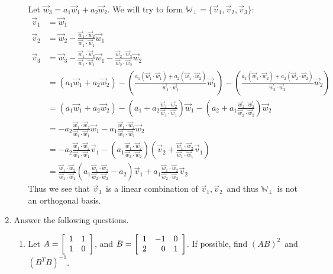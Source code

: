 \documentclass{letter}
\newcounter{question}
\newcommand{\Vn}[1]{\vec{#1}}
\newcommand{\?}{\stackrel{?}{=}}
\newcommand\Que[1]{%
   \leavevmode\noindent
   #1
}
\newcommand\Ans[2][]{%
   \leavevmode\noindent
   {
       \begin{mdframed}[backgroundcolor=blue!10]
       #2
       \end{mdframed}
   }
}
\newenvironment{Mat}[1]{%
  \left[\begin{array}{*{#1}{r}}
}{%
  \end{array}\right]
}
\begin{document}
\begin{enumerate}
\begin{enumerate}[label=(\alph*)]
    \Ans{
        Let $\Vn{w}_3 = a_1\Vn{w}_1 + a_2\Vn{w}_2$.  We will try to form $\mathbb{W}_\perp=\{\Vn{v}_1,\Vn{v}_2,\Vn{v}_3\}$:
        \begin{align*}
            \Vn{v}_1 &= \Vn{w}_1 \\
            \Vn{v}_2 &= \Vn{w}_2 - \frac{\Vn{w}_1\cdot\Vn{w}_2}{\Vn{w}_1\cdot\Vn{w}_1}\Vn{w}_1\\
            \Vn{v}_3 &= \Vn{w}_3 - \frac{\Vn{w}_1\cdot\Vn{w}_3}{\Vn{w}_1\cdot\Vn{w}_1}\Vn{w}_1 - \frac{\Vn{w}_2\cdot\Vn{w}_3}{\Vn{w}_2\cdot\Vn{w}_2}\Vn{w}_2 \\
            &= (a_1\Vn{w}_1 + a_2\Vn{w}_2) - 
               \left(\frac{a_1(\Vn{w}_1\cdot\Vn{w}_1)+a_2(\Vn{w}_1\cdot\Vn{w}_2)}{\Vn{w}_1\cdot\Vn{w}_1}\Vn{w}_1\right) -
               \left(\frac{a_1(\Vn{w}_1\cdot\Vn{w}_2)+a_2(\Vn{w}_2\cdot\Vn{w}_2)}{\Vn{w}_2\cdot\Vn{w}_2}\Vn{w}_2\right)\\
            &= (a_1\Vn{w}_1 + a_2\Vn{w}_2) -
               \left( a_1 + a_2\frac{\Vn{w}_1\cdot\Vn{w}_2}{\Vn{w}_1\cdot\Vn{w}_1}\right)\Vn{w}_1 -
               \left(a_2 + a_1\frac{\Vn{w}_1\cdot\Vn{w}_2}{\Vn{w}_2\cdot\Vn{w}_2}\right)\Vn{w}_2 \\
            &= -a_2\frac{\Vn{w}_1\cdot\Vn{w}_2}{\Vn{w}_1\cdot\Vn{w}_1}\Vn{w}_1 - 
                a_1\frac{\Vn{w}_1\cdot\Vn{w}_2}{\Vn{w}_2\cdot\Vn{w}_2}\Vn{w}_2 \\
            &= -a_2\frac{\Vn{w}_1\cdot\Vn{w}_2}{\Vn{w}_1\cdot\Vn{w}_1}\Vn{v}_1 - 
               \left(a_1\frac{\Vn{w}_1\cdot\Vn{w}_2}{\Vn{w}_2\cdot\Vn{w}_2}\right)
               \left(\Vn{v}_2 + \frac{\Vn{w}_1\cdot\Vn{w}_2}{\Vn{w}_1\cdot\Vn{w}_1}\Vn{v}_1\right)\\
            &= \frac{\Vn{w}_1\cdot\Vn{w}_2}{\Vn{w}_1\cdot\Vn{w}_1}
               \left(a_1\frac{\Vn{w}_1\cdot\Vn{w}_2}{\Vn{w}_2\cdot\Vn{w}_2}-a_2\right)\Vn{v}_1 +
               a_1\frac{\Vn{w}_1\cdot\Vn{w}_2}{\Vn{w}_2\cdot\Vn{w}_2}\Vn{v}_2
        \end{align*}
        Thus we see that $\Vn{v}_3$\ is a linear combination of $\Vn{v}_1,\Vn{v}_2$\ and thus $\mathbb{W}_\perp$\ is not an orthogonal basis.
    }
    \end{enumerate}
    \newpage
    \item Answer the following questions.
    \begin{enumerate}[label=(\alph*)]
    \item \Que{
        Let $A=\begin{Mat}{2} 1 & 1 \\ 1 & 0 \end{Mat}$, and $B=\begin{Mat}{3} 1 & -1 & 0 \\ 2 & 0 & 1 \end{Mat}$.  If possible, find $(AB)^2$\ and $(B^TB)^{-1}$.
}
\end{enumerate}
\end{enumerate}
\end{document}
